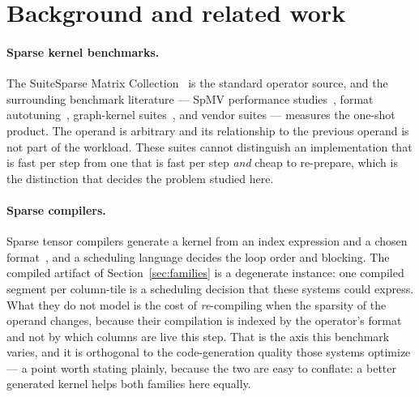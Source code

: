 \documentclass{article}
\begin{document}
\section{Background and related work}
\label{sec:related}

\paragraph{Sparse kernel benchmarks.}
The SuiteSparse Matrix Collection~\citep{davis2011} is the standard operator
source, and the surrounding benchmark literature --- SpMV performance
studies~\citep{williams2007, vuduc2003}, format autotuning~\citep{im2004},
graph-kernel suites~\citep{beamer2015}, and vendor suites --- measures the
one-shot product. The operand is arbitrary and its relationship to the previous
operand is not part of the workload. These suites cannot distinguish an
implementation that is fast per step from one that is fast per step \emph{and}
cheap to re-prepare, which is the distinction that decides the problem studied
here.

\paragraph{Sparse compilers.}
Sparse tensor compilers generate a kernel from an index expression and a chosen
format~\citep{kjolstad2017, ye2023}, and a scheduling language decides the loop
order and blocking. The compiled artifact of Section~\ref{sec:families} is a
degenerate instance: one compiled segment per column-tile is a scheduling
decision that these systems could express. What they do not model is the cost of
\emph{re}-compiling when the sparsity of the operand changes, because their
compilation is indexed by the operator's format and not by which columns are
live this step. That is the axis this benchmark varies, and it is orthogonal to
the code-generation quality those systems optimize --- a point worth stating
plainly, because the two are easy to conflate: a better generated kernel helps
both families here equally.
\end{document}
